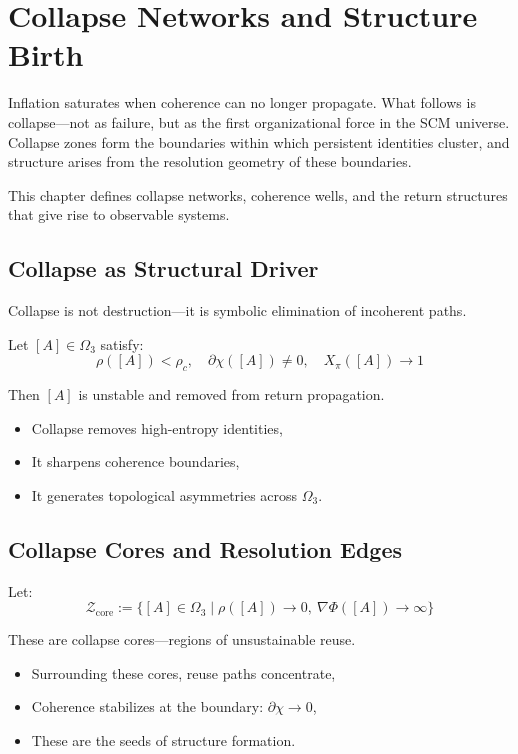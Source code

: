 \chapter{Collapse Networks and Structure Birth} \label{chapter-collapse-networks}

Inflation saturates when coherence can no longer propagate. What follows is collapse—not as failure, but as the first organizational force in the SCM universe. Collapse zones form the boundaries within which persistent identities cluster, and structure arises from the resolution geometry of these boundaries.

This chapter defines collapse networks, coherence wells, and the return structures that give rise to observable systems.

\section{Collapse as Structural Driver} \label{sec:collapse-driver}

Collapse is not destruction—it is symbolic elimination of incoherent paths.

Let $[A] \in \Omega_3$ satisfy:
\[
\rho([A]) < \rho_c,\quad \partial\chi([A]) \ne 0,\quad X_\pi([A]) \to 1
\]

Then $[A]$ is unstable and removed from return propagation.

\begin{itemize}
  \item Collapse removes high-entropy identities,
  \item It sharpens coherence boundaries,
  \item It generates topological asymmetries across $\Omega_3$.
\end{itemize}

\section{Collapse Cores and Resolution Edges} \label{sec:collapse-cores}

Let:
\[
\mathcal{Z}_{\text{core}} := \{ [A] \in \Omega_3 \mid \rho([A]) \to 0,\ \nabla\Phi([A]) \to \infty \}
\]

These are collapse cores—regions of unsustainable reuse.

\begin{itemize}
  \item Surrounding these cores, reuse paths concentrate,
  \item Coherence stabilizes at the boundary: $\partial\chi \to 0$,
  \item These are the seeds of structure formation.
\end{itemize}

